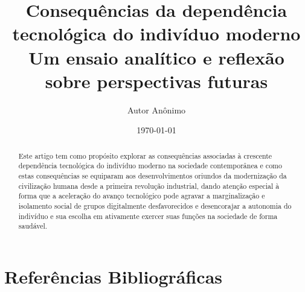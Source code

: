 \documentclass[12pt]{article}
\title{%
    Consequências da dependência tecnológica do indivíduo moderno\\
   \large Um ensaio analítico e reflexão sobre perspectivas futuras}
\author[1]{Autor Anônimo}
\date{\today}
\affil[1]{Departamento de Informática e Estatística, Universidade Federal de Santa Catarina}
\begin{document}
\begin{titlepage}
\maketitle
\thispagestyle{empty}

\begin{abstract}
  Este artigo tem como propósito explorar as consequências associadas à crescente dependência tecnológica do indivíduo
  moderno na sociedade contemporânea e como estas consequências se equiparam aos desenvolvimentos oriundos da
  modernização da civilização humana desde a primeira revolução industrial, dando atenção especial à forma que a aceleração 
  do avanço tecnológico pode agravar a marginalização e isolamento social de grupos digitalmente desfavorecidos e desencorajar a 
  autonomia do indivíduo e sua escolha em ativamente exercer suas funções na sociedade de forma saudável.
\end{abstract}

\end{titlepage}

\tableofcontents

\printglossary[title=Glossário, toctitle=Glossário]

\newpage




\newpage
\section{Referências Bibliográficas}


\end{document}
